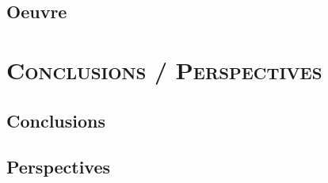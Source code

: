 \documentclass[xcolor=x11names, compress, 10pt]{beamer}
\begin{document}
\subsection{Oeuvre}
\begin{frame}[c]
    \vfill
    \vfill
\end{frame}


















\section{\scshape Conclusions / Perspectives}


\subsection{Conclusions}
\begin{frame}[c]
    \vfill
    \vfill
\end{frame}


\subsection{Perspectives}
\begin{frame}[c]
    \vfill
    \vfill
\end{frame}
\end{document}
